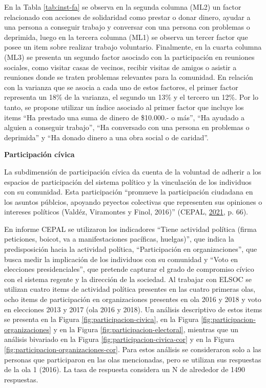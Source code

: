 \documentclass[
  12pt,
]{book}
\begin{document}
En la Tabla \ref{tab:inst-fa} se observa en la segunda columna (ML2) un factor relacionado con acciones de solidaridad como prestar o donar dinero, ayudar a una persona a conseguir trabajo y conversar con una persona con problemas o deprimida, luego en la tercera columna (ML1) se observa un tercer factor que posee un item sobre realizar trabajo voluntario. Finalmente, en la cuarta columna (ML3) se presenta un segundo factor asociado con la participación en reuniones sociales, como visitar casas de vecinos, recibir visitas de amigos o asistir a reuniones donde se traten problemas relevantes para la comunidad. En relación con la varianza que se asocia a cada uno de estos factores, el primer factor representa un 18\% de la varianza, el segundo un 13\% y el tercero un 12\%. Por lo tanto, se propone utilizar un índice asociado al primer factor que incluye los items ``Ha prestado una suma de dinero de \$10.000.- o más'', ``Ha ayudado a alguien a conseguir trabajo'', ``Ha conversado con una persona en problemas o deprimida'' y ``Ha donado dinero a una obra social o de caridad''.

\textbf{Participación cívica}

La subdimensión de participación cívica da cuenta de la voluntad de adherir a los espacios de participación del sistema político y la vinculación de los individuos con su comunidad. Esta participación ``promueve la participación ciudadana en los asuntos públcios, apoyando pryectos colectivas que representen sus opiniones o intereses políticos (Valdéz, Viramontes y Finol, 2016)'' (CEPAL, \protect\hyperlink{ref-cepal_cohesion_2021}{2021}, p. 66).

En informe CEPAL se utilizaron los indicadores ``Tiene actividad política (firma peticiones, boicot, va a manifestaciones pacíficas, huelgas)'', que indica la predisposición hacia la actividad política, ``Participación en organizaciones'', que busca medir la implicación de los individuos con su comunidad y ``Voto en elecciones presidenciales'', que pretende capturar el grado de compromiso cívico con el sistema regente y la dirección de la sociedad. Al trabajar con ELSOC se utilizan cuatro items de actividad política presentes en las cuatro primeras olas, ocho items de participación en organizaciones presentes en ola 2016 y 2018 y voto en elecciones 2013 y 2017 (ola 2016 y 2018). Un análisis descriptivo de estos items se presenta en la Figura \ref{fig:participacion-civica}, en la Figura \ref{fig:participacion-organizaciones} y en la Figura \ref{fig:participacion-electoral}, mientras que un análisis bivariado en la Figura \ref{fig:participacion-civica-cor} y en la Figura \ref{fig:participacion-organizaciones-cor}. Para estos análisis se consideraron solo a las personas que participaron en las olas mencionadas, pero se utilizan sus respuestas de la ola 1 (2016). La tasa de respuesta considera un N de alrededor de 1490 respuestas.
\end{document}
